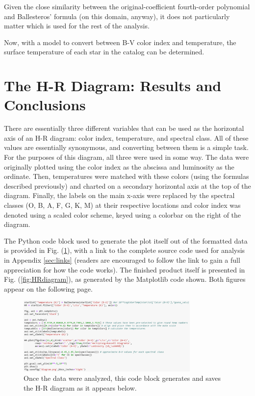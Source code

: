 \documentclass[twocolumn]{aastex63}
\begin{document}
Given the close similarity between the original-coefficient fourth-order polynomial and Ballesteros' formula (on this domain, anyway), it does not particularly matter which is used for the rest of the analysis.

Now, with a model to convert between B-V color index and temperature, the surface temperature of each star in the catalog can be determined.

\section{The H-R Diagram: Results and Conclusions} \label{sec:HR}

There are essentially three different variables that can be used as the horizontal axis of an H-R diagram: color index, temperature, and spectral class. All of these values are essentially synonymous, and converting between them is a simple task. For the purposes of this diagram, all three were used in some way. The data were originally plotted using the color index as the abscissa and luminosity as the ordinate. Then, temperatures were matched with these colors (using the formulas described previously) and charted on a secondary horizontal axis at the top of the diagram. Finally, the labels on the main x-axis were replaced by the spectral classes (O, B, A, F, G, K, M) at their respective locations and color index was denoted using a scaled color scheme, keyed using a colorbar on the right of the diagram.

The Python code block used to generate the plot itself out of the formatted data is provided in Fig. (\ref{fig:plotcode}), with a link to the complete source code used for analysis in Appendix \ref{sec:links} (readers are encouraged to follow the link to gain a full appreciation for how the code works). The finished product itself is presented in Fig. (\ref{fig:HRdiagram}), as generated by the Matplotlib code shown. Both figures appear on the following page.

\begin{figure}[!h]
    \centering
    \includegraphics[width=0.8\textwidth]{graph_code.png}
    \caption{Once the data were analyzed, this code block generates and saves the H-R diagram as it appears below.}
    \label{fig:plotcode}
\end{figure}
\end{document}
